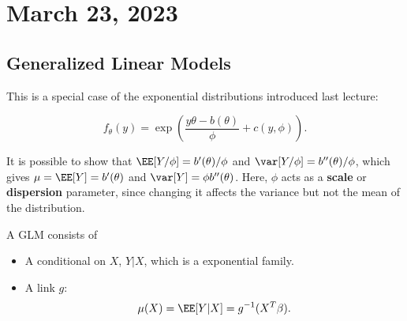 \section{March 23, 2023}

\subsection{Generalized Linear Models}

This is a special case of the exponential distributions introduced last lecture: 

\begin{definition}

\[f_{\theta}(y) = \exp\left(\frac{y\theta - b(\theta)}{\phi} + c(y, \phi)\right).\]
\end{definition}

It is possible to show that $\EE[Y/\phi] = b'(\theta)/\phi$ and $\var[Y/\phi]=b''(\theta)/\phi$, which gives $\mu = \EE[Y] = b'(\theta)$ and $\var[Y]=\phi b''(\theta)$. Here, $\phi$ acts as a \textbf{scale} or \textbf{dispersion} parameter, since changing it affects the variance but not the mean of the distribution.

\begin{definition}

A GLM consists of 
\begin{itemize}
    \item A conditional on $X$, $Y\vert X$, which is a exponential family.
    \item A link $g$:
    \[\mu(X) = \EE[Y\vert X] = g^{-1}(X^T\beta).\]
\end{itemize}
\end{definition}